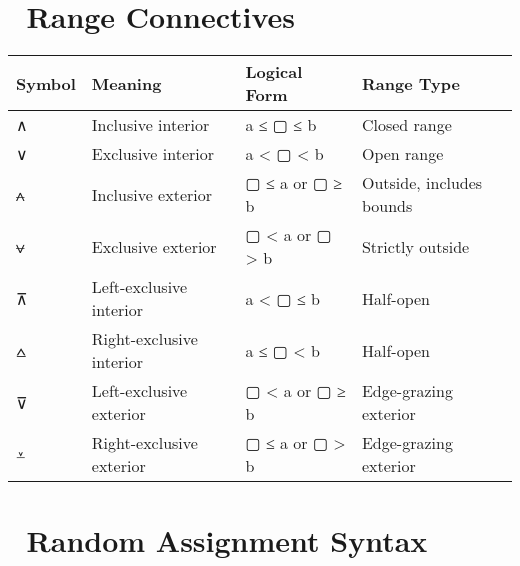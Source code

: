 \documentclass[
  letterpaper,
]{book}
\begin{document}
\section{📏 Range Connectives}\label{range-connectives}

\begin{longtable}[]{@{}
  >{\raggedright\arraybackslash}p{}
  >{\raggedright\arraybackslash}p{}
  >{\raggedright\arraybackslash}p{}
  >{\raggedright\arraybackslash}p{}@{}}
\toprule\noalign{}
\begin{minipage}[b]{\linewidth}\raggedright
Symbol
\end{minipage} & \begin{minipage}[b]{\linewidth}\raggedright
Meaning
\end{minipage} & \begin{minipage}[b]{\linewidth}\raggedright
Logical Form
\end{minipage} & \begin{minipage}[b]{\linewidth}\raggedright
Range Type
\end{minipage} \\
\midrule\noalign{}
\endhead
\bottomrule\noalign{}
\endlastfoot
∧ & Inclusive interior & a ≤ ▢ ≤ b & Closed range \\
∨ & Exclusive interior & a \textless{} ▢ \textless{} b & Open range \\
⩜ & Inclusive exterior & ▢ ≤ a or ▢ ≥ b & Outside, includes bounds \\
⩝ & Exclusive exterior & ▢ \textless{} a or ▢ \textgreater{} b &
Strictly outside \\
⊼ & Left-exclusive interior & a \textless{} ▢ ≤ b & Half-open \\
⩟ & Right-exclusive interior & a ≤ ▢ \textless{} b & Half-open \\
⊽ & Left-exclusive exterior & ▢ \textless{} a or ▢ ≥ b & Edge-grazing
exterior \\
⩡ & Right-exclusive exterior & ▢ ≤ a or ▢ \textgreater{} b &
Edge-grazing exterior \\
\end{longtable}

\section{🎲 Random Assignment Syntax}\label{random-assignment-syntax}
\end{document}
